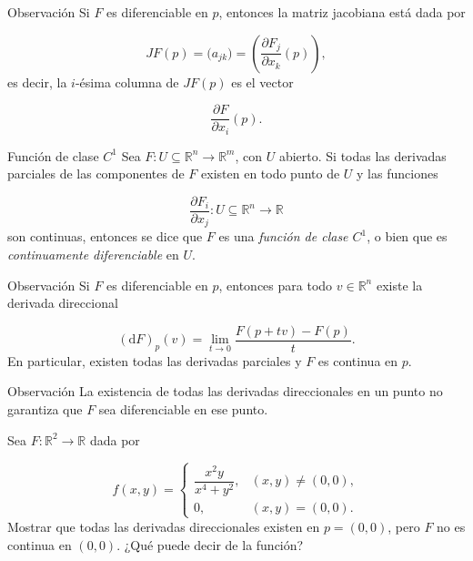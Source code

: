 \begin{bookremark}{Observación}
Si $F$ es diferenciable en $p$, entonces la matriz jacobiana está dada por

\[
JF(p)=\bigl(a_{jk}\bigr)
=
\left(\frac{\partial F_j}{\partial x_k}(p)\right),
\]
es decir, la $i$-ésima columna de $JF(p)$ es el vector

\[
\frac{\partial F}{\partial x_i}(p).
\]
\end{bookremark}
\begin{bookdefinition}{Función de clase $C^1$}
Sea $F \colon U \subseteq \mathbb{R}^n \to \mathbb{R}^m$, con $U$ abierto. Si todas las derivadas parciales de las componentes de $F$ existen en todo punto de $U$ y las funciones

\[
\frac{\partial F_i}{\partial x_j}\colon U \subseteq \mathbb{R}^{n} \to \mathbb{R}
\]
son continuas, entonces se dice que $F$ es una \emph{función de clase $C^1$}, o bien que es \emph{continuamente diferenciable} en $U$.

\end{bookdefinition}
\begin{bookremark}{Observación}
Si $F$ es diferenciable en $p$, entonces para todo $v\in \mathbb{R}^n$ existe la derivada direccional

\[
(\mathrm{d} F)_p(v)
=
\lim_{t\to 0}\frac{F(p+tv)-F(p)}{t}.
\]
En particular, existen todas las derivadas parciales y $F$ es continua en $p$.

\end{bookremark}
\begin{bookremark}{Observación}
La existencia de todas las derivadas direccionales en un punto no garantiza que $F$ sea diferenciable en ese punto.

\end{bookremark}
\begin{bookexercise}{}
Sea $F:\mathbb{R}^2\to \mathbb{R}$ dada por

\[
f(x,y)= \begin{cases} \dfrac{x^2y}{x^4+y^2}, & (x,y)\neq (0,0),\\[0.6em] 0, & (x,y)=(0,0). \end{cases}
\]
Mostrar que todas las derivadas direccionales existen en $p=(0,0)$, pero $F$ no es continua en $(0,0)$. ¿Qué puede decir de la función?

\end{bookexercise}
